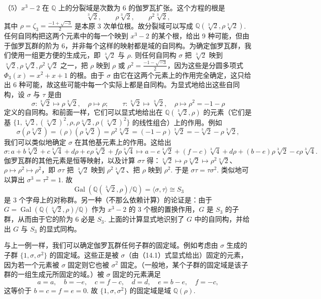 \begin{example}
（5）\(x^3-2\) 在 \(\mathbb{Q}\) 上的分裂域是次数为 6 的伽罗瓦扩张。这个方程的根是
\[
\sqrt[3]{2}, \qquad \rho\sqrt[3]{2}, \qquad \rho^2\sqrt[3]{2},
\]
其中 \(\rho = \zeta_3 = \frac{-1+\sqrt{-3}}{2}\) 是本原 3 次单位根。故分裂域可以写成 \(\mathbb{Q}(\sqrt[3]{2}, \rho\sqrt[3]{2})\). 任何自同构把这两个元素中的每一个映到 \(x^3-2\) 的某个根，给出 9 种可能，但由于伽罗瓦群的阶为 6，并非每个这样的映射都是域的自同构。为确定伽罗瓦群，我们使用一组更方便的生成元，即 \(\sqrt[3]{2}\) 与 \(\rho\). 则任何自同构 \(\sigma\) 把 \(\sqrt[3]{2}\) 映到 \(\sqrt[3]{2}, \rho\sqrt[3]{2}, \rho^2\sqrt[3]{2}\) 之一，把 \(\rho\) 映到 \(\rho\) 或 \(\rho^2 = \frac{-1-\sqrt{-3}}{2}\)，因为这些是分圆多项式 \(\Phi_3(x) = x^2+x+1\) 的根。由于 \(\sigma\) 由它在这两个元素上的作用完全确定，这只给出 6 种可能，故这些可能中每一个实际上都是自同构。为显式地给出这些自同构，设 \(\sigma\) 与 \(\tau\) 是由
\[
\sigma : \sqrt[3]{2} \mapsto \rho\sqrt[3]{2}, \quad \rho \mapsto \rho; \qquad \tau : \sqrt[3]{2} \mapsto \sqrt[3]{2}, \quad \rho \mapsto \rho^2 = -1-\rho
\]
定义的自同构。和前面一样，它们可以显式地给出在 \(\mathbb{Q}(\sqrt[3]{2}, \rho)\) 的元素（它们是基 \(\{1, \sqrt[3]{2}, (\sqrt[3]{2})^2, \rho, \rho\sqrt[3]{2}, \rho(\sqrt[3]{2})^2\}\) 的线性组合）上的作用。例如
\[
\sigma(\rho\sqrt[3]{2}) = (\rho)(\rho\sqrt[3]{2}) = \rho^2\sqrt[3]{2} = (-1-\rho)\sqrt[3]{2} = -\sqrt[3]{2}-\rho\sqrt[3]{2},
\]
我们可以类似地确定 \(\sigma\) 在其他基元素上的作用。这给出
\begin{equation}
\sigma : a+b\sqrt[3]{2}+c\sqrt[3]{4}+d\rho+e\rho\sqrt[3]{2}+f\rho\sqrt[3]{4} \mapsto a-e\sqrt[3]{2}+(f-c)\sqrt[3]{4}+d\rho+(b-e)\rho\sqrt[3]{2}-c\rho\sqrt[3]{4}. \tag{14.1}
\end{equation}
伽罗瓦群的其他元素是恒等映射，以及计算 \(\sigma\tau\) 得：\(\sqrt[3]{2} \mapsto \rho\sqrt[3]{2} \mapsto \rho^2\sqrt[3]{2}\)、\(\rho \mapsto \rho^2 \mapsto \rho^2\)，即 \(\sigma\tau\) 把 \(\sqrt[3]{2}\) 映到 \(\rho^2\sqrt[3]{2}\)、把 \(\rho\) 映到 \(\rho^2\). 于是 \(\sigma\tau = \tau\sigma^2\). 类似地可以算出 \(\sigma^3 = \tau^2 = 1\). 故
\[
\operatorname{Gal}(\mathbb{Q}(\sqrt[3]{2}, \rho)/\mathbb{Q}) = \langle \sigma, \tau \rangle \cong S_3
\]
是 3 个字母上的对称群。另一种（不那么依赖计算）的论证是：由于 \(G = \operatorname{Gal}(\mathbb{Q}(\sqrt[3]{2}, \rho)/\mathbb{Q})\) 作为 \(x^3-2\) 的 3 个根的置换作用，\(G\) 是 \(S_3\) 的子群，从而由于它的阶为 6 必是 \(S_3\). 上面的计算显式地识别了 \(G\) 中的自同构，并给出 \(G\) 与 \(S_3\) 的显式同构。

与上一例一样，我们可以确定伽罗瓦群任何子群的固定域。例如考虑由 \(\sigma\) 生成的子群 \(\{1, \sigma, \sigma^2\}\) 的固定域。这些正是被 \(\sigma\)（由（14.1）式显式给出）固定的元素，因为若一个元素被 \(\sigma\) 固定则它也被 \(\sigma^2\) 固定。（一般地，某个子群的固定域是该子群的一组生成元所固定的域。）被 \(\sigma\) 固定的元素满足
\[
a = a,\quad b = -e,\quad c = f-c,\quad d = d,\quad e = b-e,\quad f = -c,
\]
这等价于 \(b = c = f = e = 0\). 故 \(\{1, \sigma, \sigma^2\}\) 的固定域是域 \(\mathbb{Q}(\rho)\).


\end{example}
